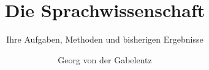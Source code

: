 \title{Die Sprach\-wissenschaft}  %
\subtitle{Ihre Aufgaben, Methoden und bisherigen Ergebnisse}%
\dedication{Change dedication in localmetadata.tex}
\author{Georg von der Gabelentz}
\renewcommand{\lsISBN}{978-3-000000-00-0}                     
\renewcommand{\lsSeries}{dummyseries} %
\renewcommand{\lsSeriesNumber}{99} %
\renewcommand{\lsURL}{http://langsci-press.org/catalog/book/0} %
